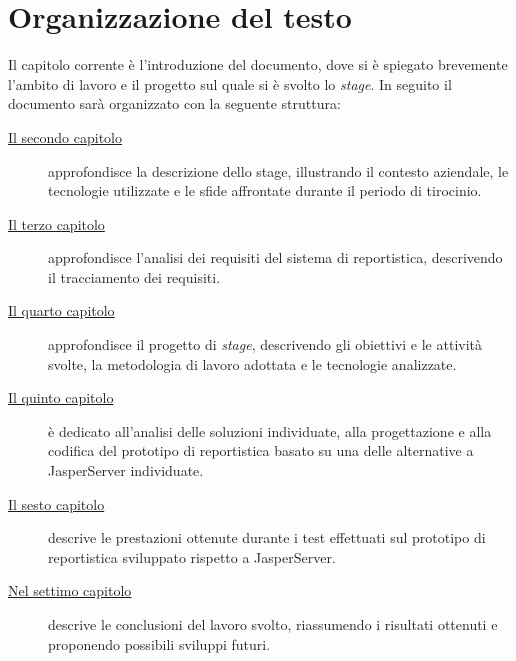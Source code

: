 \section{Organizzazione del testo}
\label{sec:organizzazione-testo}
Il capitolo corrente è l'introduzione del documento, dove si è spiegato brevemente
l'ambito di lavoro e il progetto sul quale si è svolto lo \emph{stage}.
In seguito il documento sarà organizzato con la seguente struttura:
\begin{description}
    \item[{\hyperref[cap:descrizione-stage]{Il secondo capitolo}}] approfondisce la descrizione dello stage, illustrando il contesto aziendale, le tecnologie utilizzate e le sfide affrontate durante il periodo di tirocinio.
    
    \item[{\hyperref[cap:analisi-requisiti]{Il terzo capitolo}}] approfondisce l'analisi dei requisiti del sistema di reportistica, descrivendo il tracciamento dei requisiti.

    \item[{\hyperref[cap:processi-metodologie]{Il quarto capitolo}}]  approfondisce il progetto di \emph{stage}, descrivendo gli obiettivi e le attività svolte, la metodologia di lavoro adottata e le tecnologie analizzate.
    
    \item[{\hyperref[cap:progettazione-codifica]{Il quinto capitolo}}] è dedicato all'analisi delle soluzioni individuate, alla progettazione e alla codifica del prototipo di reportistica basato su una delle alternative a JasperServer individuate.
    
    \item[{\hyperref[cap:valutazione]{Il sesto capitolo}}] descrive le prestazioni ottenute durante i test effettuati sul prototipo di reportistica sviluppato rispetto a JasperServer.
    
    \item[{\hyperref[cap:conclusioni]{Nel settimo capitolo}}] descrive le conclusioni del lavoro svolto, riassumendo i risultati ottenuti e proponendo possibili sviluppi futuri.
\end{description}

